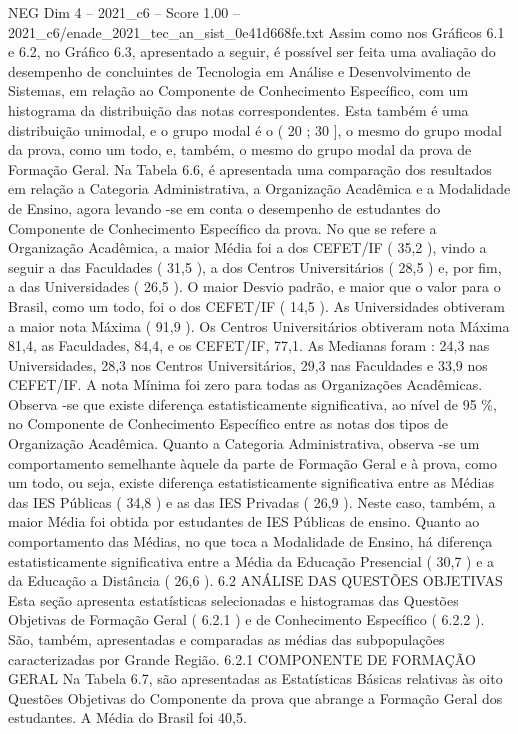 \begin{textsample}{NEG Dim 4 – 2021\_c6 – Score 1.00 – 2021\_c6/enade\_2021\_tec\_an\_sist\_0e41d668fe.txt}
Assim como nos Gráficos 6.1 e 6.2, no Gráfico 6.3, apresentado a seguir, é possível ser feita uma avaliação do desempenho de concluintes de Tecnologia em Análise e Desenvolvimento de Sistemas, em relação ao Componente de Conhecimento Específico, com um histograma da distribuição das notas correspondentes.
Esta também é uma distribuição unimodal, e o grupo modal é o ( 20 ; 30 ], o mesmo do grupo modal da prova, como um todo, e, também, o mesmo do grupo modal da prova de Formação Geral.
Na Tabela 6.6, é apresentada uma comparação dos resultados em relação a Categoria Administrativa, a Organização Acadêmica e a Modalidade de Ensino, agora levando -se em conta o desempenho de estudantes do Componente de Conhecimento Específico da prova.
No que se refere a Organização Acadêmica, a maior Média foi a dos CEFET/IF ( 35,2 ), vindo a seguir a das Faculdades ( 31,5 ), a dos Centros Universitários ( 28,5 ) e, por fim, a das Universidades ( 26,5 ).
O maior Desvio padrão, e maior que o valor para o Brasil, como um todo, foi o dos CEFET/IF ( 14,5 ).
As Universidades obtiveram a maior nota Máxima ( 91,9 ).
Os Centros Universitários obtiveram nota Máxima 81,4, as Faculdades, 84,4, e os CEFET/IF, 77,1.
As Medianas foram : 24,3 nas Universidades, 28,3 nos Centros Universitários, 29,3 nas Faculdades e 33,9 nos CEFET/IF.
A nota Mínima foi zero para todas as Organizações Acadêmicas.
Observa -se que existe diferença estatisticamente significativa, ao nível de 95 \%, no Componente de Conhecimento Específico entre as notas dos tipos de Organização Acadêmica.
Quanto a Categoria Administrativa, observa -se um comportamento semelhante àquele da parte de Formação Geral e à prova, como um todo, ou seja, existe diferença estatisticamente significativa entre as Médias das IES Públicas ( 34,8 ) e as das IES Privadas ( 26,9 ).
Neste caso, também, a maior Média foi obtida por estudantes de IES Públicas de ensino.
Quanto ao comportamento das Médias, no que toca a Modalidade de Ensino, há diferença estatisticamente significativa entre a Média da Educação Presencial ( 30,7 ) e a da Educação a Distância ( 26,6 ). 6.2 ANÁLISE DAS QUESTÕES OBJETIVAS Esta seção apresenta estatísticas selecionadas e histogramas das Questões Objetivas de Formação Geral ( 6.2.1 ) e de Conhecimento Específico ( 6.2.2 ).
São, também, apresentadas e comparadas as médias das subpopulações caracterizadas por Grande Região. 6.2.1 COMPONENTE DE FORMAÇÃO GERAL Na Tabela 6.7, são apresentadas as Estatísticas Básicas relativas às oito Questões Objetivas do Componente da prova que abrange a Formação Geral dos estudantes.
A Média do Brasil foi 40,5.

\end{textsample}
